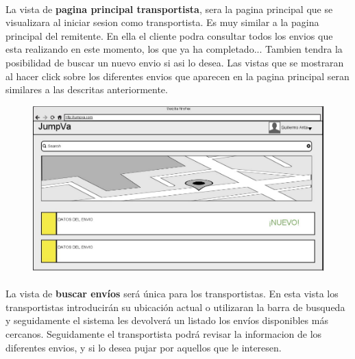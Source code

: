 \documentclass[10pt, a4paper,spanish]{article}
\begin{document}
		\paragraph{}
		La vista de \textbf{pagina principal transportista}, sera la pagina principal que se visualizara al iniciar sesion como transportista. Es muy similar a la pagina principal del remitente. En ella el cliente podra consultar todos los envios que esta realizando en este momento, los que ya ha completado... Tambien tendra la posibilidad de buscar un nuevo envio si asi lo desea. Las vistas que se mostraran al hacer click sobre los diferentes envios que aparecen en la pagina principal seran similares a las descritas anteriormente.


		\begin{figure}[H]
			\centering
			\begin{minipage}[b]{0.7\textwidth}
				\includegraphics[width=\textwidth]{res/BuscarEnviosTransportista.png}
			\end{minipage}
		\end{figure}

		\paragraph{}
		La vista de \textbf{buscar envíos} será única para los transportistas. En esta vista los transportistas introducirán su ubicación actual o utilizaran la barra de busqueda y seguidamente el sistema les devolverá un listado los envíos disponibles más cercanos. Seguidamente el transportista podrá revisar la informacion de los diferentes envios, y si lo desea pujar por aquellos que le interesen.
\end{document}
